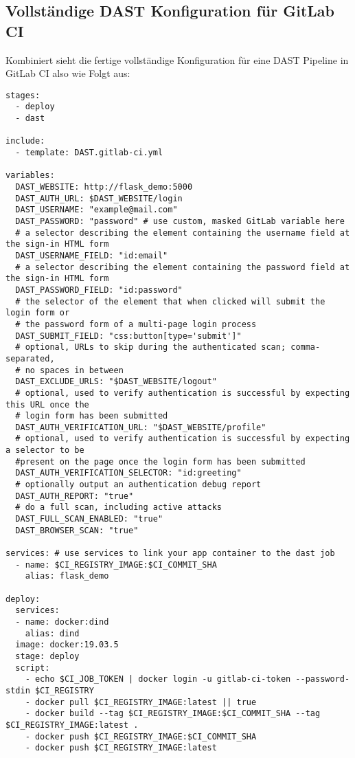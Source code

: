 \subsection{Vollständige DAST Konfiguration für GitLab CI}

Kombiniert sieht die fertige vollständige Konfiguration für eine DAST Pipeline in GitLab CI also wie Folgt aus:
\begin{verbatim}
stages:
  - deploy
  - dast

include:
  - template: DAST.gitlab-ci.yml

variables:
  DAST_WEBSITE: http://flask_demo:5000
  DAST_AUTH_URL: $DAST_WEBSITE/login
  DAST_USERNAME: "example@mail.com"
  DAST_PASSWORD: "password" # use custom, masked GitLab variable here
  # a selector describing the element containing the username field at the sign-in HTML form
  DAST_USERNAME_FIELD: "id:email"
  # a selector describing the element containing the password field at the sign-in HTML form
  DAST_PASSWORD_FIELD: "id:password"
  # the selector of the element that when clicked will submit the login form or
  # the password form of a multi-page login process
  DAST_SUBMIT_FIELD: "css:button[type='submit']"
  # optional, URLs to skip during the authenticated scan; comma-separated,
  # no spaces in between
  DAST_EXCLUDE_URLS: "$DAST_WEBSITE/logout"
  # optional, used to verify authentication is successful by expecting this URL once the
  # login form has been submitted
  DAST_AUTH_VERIFICATION_URL: "$DAST_WEBSITE/profile"
  # optional, used to verify authentication is successful by expecting a selector to be
  #present on the page once the login form has been submitted
  DAST_AUTH_VERIFICATION_SELECTOR: "id:greeting"
  # optionally output an authentication debug report
  DAST_AUTH_REPORT: "true"
  # do a full scan, including active attacks
  DAST_FULL_SCAN_ENABLED: "true"
  DAST_BROWSER_SCAN: "true"

services: # use services to link your app container to the dast job
  - name: $CI_REGISTRY_IMAGE:$CI_COMMIT_SHA
    alias: flask_demo

deploy:
  services:
  - name: docker:dind
    alias: dind
  image: docker:19.03.5
  stage: deploy
  script:
    - echo $CI_JOB_TOKEN | docker login -u gitlab-ci-token --password-stdin $CI_REGISTRY
    - docker pull $CI_REGISTRY_IMAGE:latest || true
    - docker build --tag $CI_REGISTRY_IMAGE:$CI_COMMIT_SHA --tag $CI_REGISTRY_IMAGE:latest .
    - docker push $CI_REGISTRY_IMAGE:$CI_COMMIT_SHA
    - docker push $CI_REGISTRY_IMAGE:latest
\end{verbatim}
